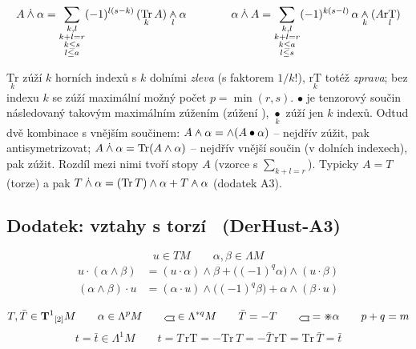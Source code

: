 \[
  A\gmIdotwedge\alpha = \sum_{\substack{k,l\\k+l=r\\k\leq s\\l\leq a}}(-1)^{l(s-k)}\,(\underset{k}{\mathrm{Tr}}\,A)\underset{l}{\gmIwedgedot}\alpha
  \qquad\qquad
  \alpha\gmIdotwedge A = \sum_{\substack{k,l\\k+l=r\\k\leq a\\l\leq s}}(-1)^{k(s-l)}\,\alpha\underset{k}{\gmIwedgedot}(A\underset{l}{\mathrm{rT}})
\]

\begin{vysvetleni}
$\underset{k}{\mathrm{Tr}}$ zúží $k$ horních indexů s $k$ dolními \emph{zleva} (s faktorem $1/k!$), $\underset{k}{\mathrm{rT}}$ totéž \emph{zprava};
bez indexu $k$ se zúží maximální možný počet $p=\min(r,s)$. $\bullet$ je tenzorový součin následovaný takovým maximálním zúžením
(zúžení ), $\underset{k}{\bullet}$ zúží jen $k$ indexů. Odtud dvě kombinace s vnějším součinem:
$A\gmIwedgedot\alpha = \wedge(A\bullet\alpha)$ -- nejdřív zúžit, pak antisymetrizovat; $A\mathbin{\dot\wedge}\alpha = \mathrm{Tr}(A\wedge\alpha)$ -- nejdřív vnější součin
(v dolních indexech), pak zúžit. Rozdíl mezi nimi tvoří stopy $A$ (vzorce s $\sum_{k+l=r}$). Typicky $A = T$ (torze) a pak
$T\gmIdotwedge\alpha = (\mathrm{Tr}\,T)\wedge\alpha + T\gmIwedgedot\alpha$ (dodatek A3).
\end{vysvetleni}

\subsection*{Dodatek: vztahy s torzí \ \normalfont\small(DerHust-A3)}

\[
  u\in TM \qquad \alpha,\beta\in\Lambda M
\]
\begin{align*}
  u\cdot(\alpha\wedge\beta) &= (u\cdot\alpha)\wedge\beta + \big((-1)^q\alpha\big)\wedge(u\cdot\beta) \\
  (\alpha\wedge\beta)\cdot u &= (\alpha\cdot u)\wedge\big((-1)^q\beta\big) + \alpha\wedge(\beta\cdot u)
\end{align*}

\[
  T,\bar T\in\mathbf{T}^1{}_{[2]}M \qquad \alpha\in\Lambda^pM \qquad \gmIhustsym\in\Lambda^{*q}M
  \qquad \bar T = -T \qquad \gmIhustsym = \gmIhdual\alpha \qquad p+q = m
\]
\[
  t = \bar t\in\Lambda^1M \qquad t = T\,\mathrm{rT} = -\mathrm{Tr}\,T = -\bar T\,\mathrm{rT} = \mathrm{Tr}\,\bar T = \bar t
\]

